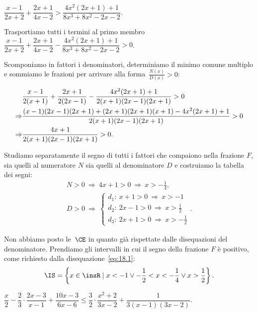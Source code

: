 \begin{exrig}
 \begin{esempio}
 $\dfrac{x-1}{2x+2}+\dfrac{2x+1}{4x-2}>\dfrac{4x^{2}(2x+1)+1}{8x^{3}+8x^{2}-2x-2}.$

Trasportiamo tutti i termini al primo membro~$\dfrac{x-1}{2x+2}+\dfrac{2x+1}{4x-2}-\dfrac{4x^{2}(2x+1)+1}{8x^{3}+8x^{2}-2x-2}>0$.

Scomponiamo in fattori i denominatori, determiniamo il minimo comune
multiplo e sommiamo le frazioni per arrivare alla forma~$\frac{N(x)}{D(x)}>0$:

\begin{align}
&\frac{x-1}{2(x+1)}+\frac{2x+1}{2(2x-1)}-\frac{4x^{2}(2x+1)+1}{2(x+1)(2x-1)(2x+1)}>0 \notag\\
\Rightarrow & \frac{(x-1)(2x-1)(2x+1)+(2x+1)(2x+1)(x+1)-4x^{2}(2x+1)+1}{2(x+1)(2x-1)(2x+1)}>0 \notag\\
\Rightarrow & \frac{4x+1}{2(x+1)(2x-1)(2x+1)}>0. \label{eq:18.1}
\end{align}

Studiamo separatamente il segno di tutti i fattori che compaiono nella
frazione $F$, sia quelli al numeratore $N$ sia quelli al denominatore $D$ e
costruiamo la tabella dei segni:
 \[\begin{gathered}
 N>0\:\Rightarrow\: 4x+1>0\:\Rightarrow\: x>-{\frac{1}{4}}\text{,}\\
 D>0\:\Rightarrow\:\left\{\begin{array}{l}
			d_1:\: x+1>0\:\Rightarrow\: x>-1 \\
			d_2:\: 2x-1>0\:\Rightarrow\: x>\frac{1}{2}\\
			d_3:\: 2x+1>0\:\Rightarrow\: x>-{\frac{1}{2}}
		  \end{array}\right..
\end{gathered}\]
\begin{center}

\end{center}
Non abbiamo posto le~$\CE$ in quanto già rispettate dalle disequazioni
del denominatore.
Prendiamo gli intervalli in cui il segno della frazione $F$ è positivo,
come richiesto dalla disequazione~\ref{eq:18.1}:
 \[\IS=\left\{x\in \insR\mid x<-1\vee -{\frac{1}{2}}<x<-{\frac{1}{4}}\vee x>\frac{1}{2}\right\}.\]
\end{esempio}

 \begin{esempio}
$\dfrac{x}{2}-\dfrac{2}{3}\cdot {\dfrac{2x-3}{x-1}}+\dfrac{10x-3}{6x-6}\le\dfrac{3}{2}\cdot {\dfrac{x^{2}+2}{3x-2}}+\dfrac{1}{3(x-1)(3x-2)}.$


\end{esempio}
\end{exrig}
